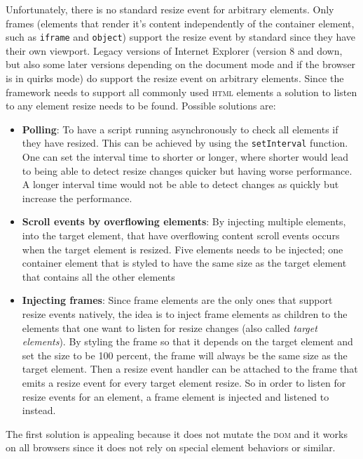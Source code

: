 \documentclass[a4paper,11pt]{kth-mag}
\newcommand{\code}[1]{\texttt{#1}}
\begin{document}
          Unfortunately, there is no standard resize event for arbitrary elements.
          Only frames (elements that render it's content independently of the container element, such as \code{iframe} and \code{object}) support the resize event by standard since they have their own viewport.
          Legacy versions of Internet Explorer (version 8 and down, but also some later versions depending on the document mode and if the browser is in quirks mode) do support the resize event on arbitrary elements.
          Since the framework needs to support all commonly used \textsc{html} elements a solution to listen to any element resize needs to be found.
          Possible solutions are:
          \begin{itemize}
            \item \textbf{Polling}:
              To have a script running asynchronously to check all elements if they have resized.
              This can be achieved by using the \code{setInterval} function.
              One can set the interval time to shorter or longer, where shorter would lead to being able to detect resize changes quicker but having worse performance.
              A longer interval time would not be able to detect changes as quickly but increase the performance.
            \item \textbf{Scroll events by overflowing elements}:
              By injecting multiple elements, into the target element, that have overflowing content scroll events occurs when the target element is resized.
              Five elements needs to be injected; one container element that is styled to have the same size as the target element that contains all the other elements
            \item \textbf{Injecting frames}:
              Since frame elements are the only ones that support resize events natively, the idea is to inject frame elements as children to the elements that one want to listen for resize changes (also called \emph{target elements}).
              By styling the frame so that it depends on the target element and set the size to be 100 percent, the frame will always be the same size as the target element.
              Then a resize event handler can be attached to the frame that emits a resize event for every target element resize.
              So in order to listen for resize events for an element, a frame element is injected and listened to instead.
          \end{itemize}
          The first solution is appealing because it does not mutate the \textsc{dom} and it works on all browsers since it does not rely on special element behaviors or similar.
\end{document}
